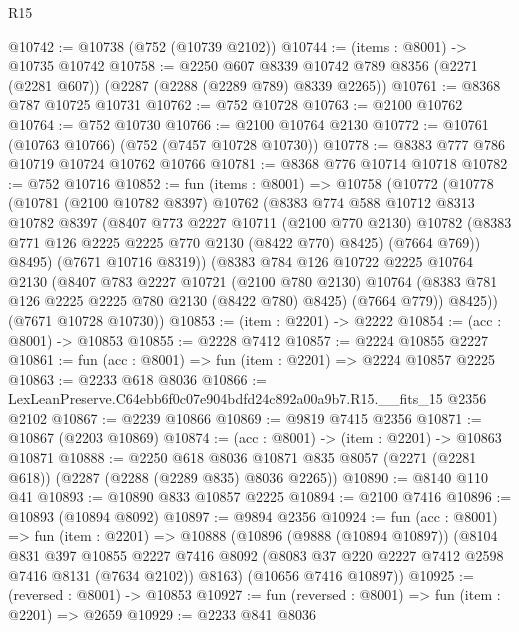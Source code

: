 \begin{lexlean}{R15}
\begin{coremodule}
@10742 := @10738 (@752 (@10739 @2102))
@10744 := (items : @8001) -> @10735 @10742
@10758 := @2250
    @607
    @8339
    @10742
    @789
    @8356
    (@2271 (@2281 @607))
    (@2287 (@2288 (@2289 @789) @8339 @2265))
@10761 := @8368 @787 @10725 @10731
@10762 := @752 @10728
@10763 := @2100 @10762
@10764 := @752 @10730
@10766 := @2100 @10764 @2130
@10772 := @10761 (@10763 @10766) (@752 (@7457 @10728 @10730))
@10778 := @8383 @777 @786 @10719 @10724 @10762 @10766
@10781 := @8368 @776 @10714 @10718
@10782 := @752 @10716
@10852 := fun (items : @8001) =>
  @10758
    (@10772
      (@10778
        (@10781
          (@2100 @10782 @8397)
          @10762
          (@8383
            @774
            @588
            @10712
            @8313
            @10782
            @8397
            (@8407
              @773
              @2227
              @10711
              (@2100 @770 @2130)
              @10782
              (@8383 @771 @126 @2225 @2225 @770 @2130 (@8422 @770) @8425)
              (@7664 @769))
            @8495)
          (@7671 @10716 @8319))
        (@8383
          @784
          @126
          @10722
          @2225
          @10764
          @2130
          (@8407
            @783
            @2227
            @10721
            (@2100 @780 @2130)
            @10764
            (@8383 @781 @126 @2225 @2225 @780 @2130 (@8422 @780) @8425)
            (@7664 @779))
          @8425))
      (@7671 @10728 @10730))
@10853 := (item : @2201) -> @2222
@10854 := (acc : @8001) -> @10853
@10855 := @2228 @7412
@10857 := @2224 @10855 @2227
@10861 := fun (acc : @8001) => fun (item : @2201) => @2224 @10857 @2225
@10863 := @2233 @618 @8036
@10866 := LexLeanPreserve.C64ebb6f0c07e904bdfd24c892a00a9b7.R15.__fits_15 @2356 @2102
@10867 := @2239 @10866
@10869 := @9819 @7415 @2356
@10871 := @10867 (@2203 @10869)
@10874 := (acc : @8001) -> (item : @2201) -> @10863 @10871
@10888 := @2250
    @618
    @8036
    @10871
    @835
    @8057
    (@2271 (@2281 @618))
    (@2287 (@2288 (@2289 @835) @8036 @2265))
@10890 := @8140 @110 @41
@10893 := @10890 @833 @10857 @2225
@10894 := @2100 @7416
@10896 := @10893 (@10894 @8092)
@10897 := @9894 @2356
@10924 := fun (acc : @8001) =>
  fun (item : @2201) =>
  @10888
    (@10896
      (@9888 (@10894 @10897))
      (@8104
        @831
        @397
        @10855
        @2227
        @7416
        @8092
        (@8083 @37 @220 @2227 @7412 @2598 @7416 @8131 (@7634 @2102))
        @8163)
      (@10656 @7416 @10897))
@10925 := (reversed : @8001) -> @10853
@10927 := fun (reversed : @8001) => fun (item : @2201) => @2659
@10929 := @2233 @841 @8036

\end{coremodule}
\end{lexlean}
